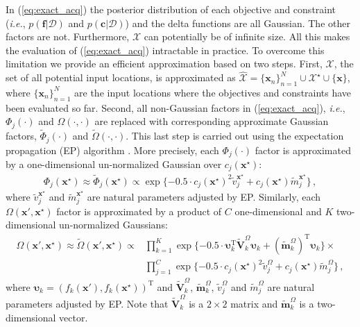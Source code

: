 \documentclass[review,preprint,12pt]{elsarticle}
\begin{document}
In (\ref{eq:exact_acq}) the posterior distribution of each objective  and constraint (\emph{i.e.}, 
$p(\textbf{f}|\mathcal{D})$ and $p(\textbf{c}|\mathcal{D})$) and the delta functions are all Gaussian. 
The other factors are not. Furthermore, $\mathcal{X}$ can potentially be of 
infinite size. All this makes the evaluation of (\ref{eq:exact_acq}) intractable in 
practice. To overcome this limitation we provide an efficient approximation based 
on two steps. First, $\mathcal{X}$, the set of all potential input locations, is approximated as
$\hat{\mathcal{X}} = \{\textbf{x}_n\}_{n=1}^{N} \cup \mathcal{X}^{\star} \cup \{\textbf{x}\}$, 
where $\{\textbf{x}_n\}_{n=1}^{N}$ are the input locations where the objectives and constraints 
have been evaluated so far. Second, all non-Gaussian factors in (\ref{eq:exact_acq}), 
\emph{i.e.}, $\Phi_j(\cdot)$ and $\Omega(\cdot, \cdot)$ are replaced with corresponding approximate 
Gaussian factors, $\tilde{\Phi}_j(\cdot)$ and $\tilde{\Omega}(\cdot, \cdot)$. This last step is 
carried out using the expectation propagation (EP) algorithm \citep{minka2001expectation}. 
More precisely, each $\Phi_j(\cdot)$ factor is approximated by a one-dimensional un-normalized 
Gaussian over $c_j(\mathbf{x}^\star)$: 
\begin{align}
\Phi_j(\mathbf{x}^\star) \approx \tilde{\Phi}_j(\mathbf{x}^\star) \propto
	\exp\{-0.5 \cdot c_j(\mathbf{x}^\star)^2\tilde{v}_j^{\mathbf{x}^\star} + 
	c_j(\mathbf{x}^\star) \tilde{m}_j^{\mathbf{x}^\star}\}\,,
\end{align}
where $\tilde{v}_j^{\mathbf{x}^\star}$ and $\tilde{m}_j^{\mathbf{x}^\star}$ are natural parameters
adjusted by EP.
Similarly, each $\Omega(\mathbf{x}',\mathbf{x}^\star)$ factor is approximated by a product of $C$ 
one-dimensional and $K$ two-dimensional un-normalized Gaussians:
\begin{align}
\Omega(\mathbf{x}',\mathbf{x}^\star) \approx
\tilde{\Omega}(\mathbf{x}',\mathbf{x}^\star)  \propto &
\prod_{k=1}^K \exp \{-0.5 \cdot \bm{\upsilon}_k^\text{T} \tilde{\mathbf{V}}_k^{\Omega} 
	\bm{\upsilon}_k + (\tilde{\mathbf{m}}_k^{\Omega})^\text{T} \bm{\upsilon}_k \} \times \nonumber \\
	& \prod_{j=1}^C 
	\exp\{-0.5 \cdot c_j(\mathbf{x}^\star)^2\tilde{v}_j^{\Omega} + c_j(\mathbf{x}^\star) \tilde{m}_j^{\Omega}\}
\,,
\end{align}
where $\bm{\upsilon}_k=(f_k(\mathbf{x}'),f_k(\mathbf{x}^\star))^\text{T}$ and 
$\tilde{\mathbf{V}}_k^{\Omega}$, $\tilde{\mathbf{m}}_k^{\Omega}$, 
$\tilde{v}_j^{\Omega}$ and $\tilde{m}_j^{\Omega}$ are 
natural parameters adjusted by EP. Note that $\tilde{\mathbf{V}}_k^{\Omega}$ is a $2 \times 2$ matrix and
$\tilde{\mathbf{m}}_k^{\Omega}$ is a two-dimensional vector.
\end{document}
